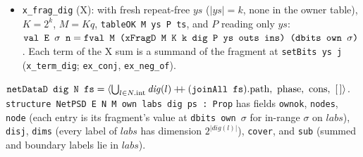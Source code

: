 \begin{theorem}
\begin{itemize}
\item \textnormal{\texttt{x\_\allowbreak{}frag\_\allowbreak{}dig}} (X): with fresh repeat-free $ys$ ($|ys|=k$, none in the owner table),
  $K=2^k$, $M=Kq$, \textnormal{\texttt{tableOK M ys P ts}}, and $P$ reading only $ys$:
  $\textnormal{\texttt{val E \ensuremath{\sigma} n}} = \textnormal{\texttt{fval M (\allowbreak{}xFragD M K k dig P ys outs ins) (\allowbreak{}dbits own \ensuremath{\sigma})}}$. Each term of
  the X sum is a summand of the fragment at \textnormal{\texttt{setBits ys j}} (\textnormal{\texttt{x\_\allowbreak{}term\_\allowbreak{}dig}}; \textnormal{\texttt{ex\_\allowbreak{}conj}},
  \textnormal{\texttt{ex\_\allowbreak{}neg\_\allowbreak{}of}}).
\end{itemize}
\end{theorem}

\begin{definition}\label{def:lean-pathsum-netpsd}
$\textnormal{\texttt{netDataD dig N fs}} = \langle\bigcup_{l\in N.\text{int}}\mathit{dig}(l)\mathbin{+\!\!+}(\textnormal{\texttt{joinAll fs}}).\text{path},\ \text{phase},\ \text{cons},\ [\,]\rangle$.
\textnormal{\texttt{structure NetPSD E N M own labs dig ps : Prop}} has fields \textnormal{\texttt{ownok}}, \textnormal{\texttt{nodes}},
\textnormal{\texttt{node}} (each entry is its fragment's value at \textnormal{\texttt{dbits own \ensuremath{\sigma}}} for in-range $\sigma$ on
$labs$), \textnormal{\texttt{disj}}, \textnormal{\texttt{dims}} (every label of $labs$ has dimension $2^{|\mathit{dig}(l)|}$),
\textnormal{\texttt{cover}}, and \textnormal{\texttt{sub}} (summed and boundary labels lie in $labs$).
\end{definition}

